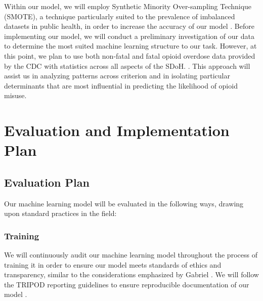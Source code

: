 \documentclass[journal]{IEEEtran}
\begin{document}
	Within our model, we will employ Synthetic Minority Over-sampling Technique (SMOTE), a technique particularly suited to the prevalence of imbalanced datasets in public health, in order to increase the accuracy of our model \cite{partonMachineLearningApproach2026, chawlaSMOTESyntheticMinority2002}. Before implementing our model, we will conduct a preliminary investigation of our data to determine the most suited machine learning structure to our task. However, at this point, we plan to use both non-fatal and fatal opioid overdose data provided by the CDC with statistics across all aspects of the SDoH. \cite{cdcDOSESYSDashboardNonfatal2026, cdcSUDORSDashboardFatal2026}. This approach will assist us in analyzing patterns across criterion and in isolating particular determinants that are most influential in predicting the likelihood of opioid misuse.

	\section{Evaluation and Implementation Plan}

	\subsection{Evaluation Plan}

	Our machine learning model will be evaluated in the following ways, drawing upon standard practices in the field:

	\subsubsection{Training}

	We will continuously audit our machine learning model throughout the process of training it in order to ensure our model meets standards of ethics and transparency, similar to the considerations emphasized by Gabriel \cite{gabrielReviewLeveragingArtificial2025}. We will follow the TRIPOD reporting guidelines to ensure reproducible documentation of our model \cite{moonsTransparentReportingMultivariable2015}.
\end{document}
